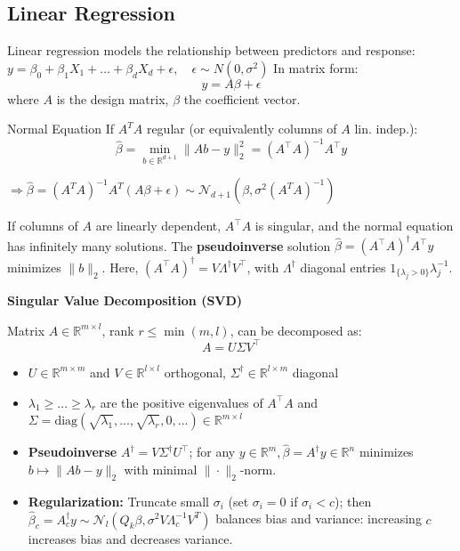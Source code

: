 \documentclass[a4paper,10pt]{article}
\newenvironment{myitemize}
{\vspace{-0.25cm}\begin{itemize}}
{\end{itemize}}
\def\R{\mathbb{R}}
\newcommand{\subtitle}[1]{\begin{normalsize}\vspace{0.25cm}\textbf{#1} \end{normalsize}}
\begin{document}
\begin{small}
\section{Linear Regression}

Linear regression models the relationship between predictors and response:
\(
y = \beta_0 + \beta_1 X_1 + \dots + \beta_d X_d + \epsilon, \quad \epsilon \sim N(0, \sigma^2)
\)
In matrix form:
\[
y = A\beta + \epsilon
\]
where \( A \) is the design matrix, \( \beta \) the coefficient vector.

\begin{subbox}{Normal Equation}
If $A^TA$ regular (or equivalently columns of $A$ lin. indep.):
\[
\hat{\beta} = \min_{b \in \mathbb{R}^{d+1}} \|A b - y\|_2^2
 = (A^\top A)^{-1} A^\top y
\]
\end{subbox}
$\Rightarrow \hat{\beta} = (A^T A)^{-1} A^T (A \beta + \epsilon) \sim \mathcal{N}_{d+1} \left( \beta, \sigma^2 (A^T A)^{-1} \right)$

If columns of \( A \) are linearly dependent, \( A^\top A \) is singular, and the normal equation has infinitely many solutions. The \textbf{pseudoinverse} solution \(\hat{\beta} = (A^\top A)^{\dagger} A^\top y\) minimizes \( \| b \|_2 \). Here, \((A^\top A)^{\dagger} = V \Lambda^{\dagger} V^\top\), with \(\Lambda^{\dagger}\) diagonal entries \(1_{\{\lambda_j > 0\}} \lambda_j^{-1}\).


\subtitle{Singular Value Decomposition (SVD)}

Matrix \( A \in \R^{m \times l}\), rank $r \leq \min(m,l)$, can be decomposed as:
\[
A = U \Sigma V^\top 
\]

\begin{myitemize}
    \item $U \in \R^{m \times m}$ and $V\in \R^{l \times l}$ orthogonal, $\Sigma^\dagger \in \R^{l \times m}$ diagonal
    \item $\lambda_1 \geq ... \geq \lambda_r$ are the positive eigenvalues of $A^\top A$ and $\Sigma = \text{diag}(\sqrt{\lambda_1}, ..., \sqrt{\lambda_r}, 0, ...) \in \R^{m \times l}$
    \item \textbf{Pseudoinverse} $A^\dagger = V \Sigma^\dagger U^\top$; for any $y \in \mathbb{R}^m, \hat{\beta} = A^{\dagger} y \in \mathbb{R}^n$ minimizes $b \mapsto \|A b - y\|_2$ with minimal $\|\cdot\|_2$-norm.
    \item \textbf{Regularization:} Truncate small \(\sigma_i\) (set \(\sigma_i = 0\) if \(\sigma_i < c\)); then \(\hat{\beta}_c = A_c^\dagger y \sim \mathcal{N}_l \left( Q_k \beta, \sigma^2 V \Lambda_c^{-1} V^T \right)\) balances bias and variance: increasing \( c \) increases bias and decreases variance.
\end{myitemize}


\end{small}
\end{document}
